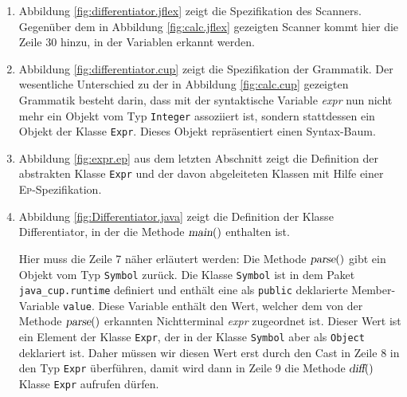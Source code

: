 \begin{enumerate}
\item Abbildung \ref{fig:differentiator.jflex} zeigt die Spezifikation des Scanners.
      Gegen\"uber dem in Abbildung \ref{fig:calc.jflex} gezeigten Scanner kommt hier die Zeile 30
      hinzu, in der Variablen erkannt werden.
\item Abbildung \ref{fig:differentiator.cup} zeigt die Spezifikation der Grammatik.
      Der wesentliche Unterschied zu der in Abbildung \ref{fig:calc.cup} gezeigten Grammatik besteht
      darin, dass mit der syntaktische Variable \textsl{expr} nun nicht mehr ein Objekt vom Typ
      \texttt{Integer} assoziiert ist, sondern stattdessen ein Objekt der Klasse \texttt{Expr}.
      Dieses Objekt repr\"asentiert einen Syntax-Baum.
\item Abbildung \ref{fig:expr.ep} aus dem letzten Abschnitt zeigt die Definition der abstrakten Klasse
      \texttt{Expr} und der davon abgeleiteten Klassen mit Hilfe einer \textsc{Ep}-Spezifikation.
\item Abbildung \ref{fig:Differentiator.java} zeigt die Definition der Klasse
      Differentiator, in der die Methode $\textsl{main}()$ enthalten ist.
  
      Hier muss die Zeile 7 n\"aher erl\"autert werden:
      Die Methode $\textsl{parse}()$ gibt ein Objekt vom Typ \texttt{Symbol} zur\"uck.  Die
      Klasse \texttt{Symbol} ist in dem Paket 
      \texttt{java\_cup.runtime} definiert und enth\"alt eine als \texttt{public} deklarierte
      Member-Variable \texttt{value}.  Diese Variable enth\"alt den Wert, welcher dem von der Methode
      $\textsl{parse}()$ erkannten Nichtterminal \textsl{expr} zugeordnet ist.  Dieser Wert ist ein
      Element der Klasse \texttt{Expr}, der in der Klasse \texttt{Symbol} aber als \texttt{Object} 
      deklariert ist.  Daher m\"ussen wir diesen Wert erst durch den Cast in Zeile 8 in den Typ 
      \texttt{Expr} \"uberf\"uhren, damit wird dann in Zeile 9 die Methode $\textsl{diff}()$  Klasse
      \texttt{Expr} aufrufen d\"urfen.
\end{enumerate}


